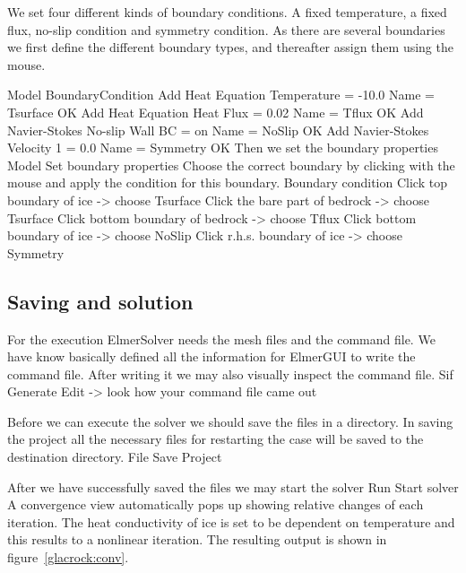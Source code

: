 We set four different kinds of boundary conditions. A fixed temperature, a fixed 
flux, no-slip condition and symmetry condition. As there are several boundaries
we first define the different boundary types, and thereafter assign them using the mouse.

\ttbegin
Model
  BoundaryCondition
    Add 
      Heat Equation
        Temperature = -10.0
      Name = Tsurface
      OK
    Add 
      Heat Equation
        Heat Flux = 0.02
      Name = Tflux
      OK
    Add 
      Navier-Stokes
        No-slip Wall BC = on
      Name = NoSlip
      OK
    Add 
      Navier-Stokes
        Velocity 1 = 0.0
      Name = Symmetry
      OK
\ttend   
Then we set the boundary properties 
\ttbegin
Model 
  Set boundary properties  
\ttend
Choose the correct boundary by clicking with the mouse
and apply the condition for this boundary.
\ttbegin
Boundary condition
  Click top boundary of ice -> choose Tsurface
  Click the bare part of bedrock -> choose Tsurface
  Click bottom boundary of bedrock -> choose Tflux
  Click bottom boundary of ice -> choose NoSlip
  Click r.h.s. boundary of ice -> choose Symmetry
\ttend

\subsection*{Saving and solution}

For the execution 
ElmerSolver needs the mesh files and the command file. We have know basically defined
all the information for ElmerGUI to write the command file. After writing it we may also visually 
inspect the command file.
\ttbegin
Sif 
  Generate
  Edit -> look how your command file came out  
\ttend

Before we can execute the solver we should save the files in a directory. In saving the project all the
necessary files for restarting the case will be saved to the 
destination directory.
\ttbegin
File 
  Save Project
\ttend

After we have successfully saved the files we may start the solver
\ttbegin
Run
  Start solver
\ttend
A convergence view automatically pops up showing relative changes of each iteration.
The heat conductivity of ice is set to be dependent on temperature and this results to a 
nonlinear iteration.
The resulting output is shown in figure~\ref{glacrock:conv}.

